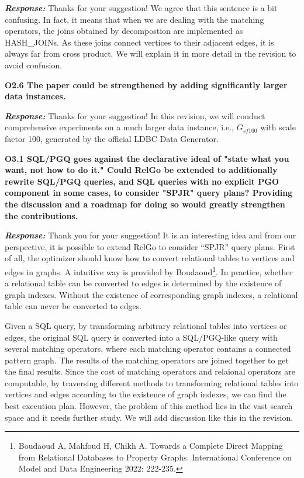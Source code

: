 \textbf{\textit{Response: }}
Thanks for your suggestion! We agree that this sentence is a bit confusing. In fact, it means that when we are dealing with the matching operators, the joins obtained by decompostion are implemented as HASH\_JOINs. As these joins connect vertices to their adjacent edges, it is always far from cross product. We will explain it in more detail in the revision to avoid confusion.


\textbf{
O2.6 The paper could be strengthened by adding significantly larger data instances.}

\textbf{\textit{Response: }}
Thanks for your suggestion! In this revision, we will conduct comprehensive experiments on a much larger data instance, i.e., $G_{sf100}$ with scale factor 100, generated by the official LDBC Data Generator.


\textbf{O3.1 SQL/PGQ goes against the declarative ideal of "state what you want, not how to do it." 
Could RelGo be extended to additionally rewrite SQL/PGQ queries, and SQL queries with no explicit PGO component in some cases, to consider "SPJR" query plans? 
Providing the discussion and a roadmap for doing so would greatly strengthen the contributions.}

\textbf{\textit{Response: }}
Thank you for your suggestion! 
It is an interesting idea and from our perspective, it is possible to extend RelGo to consider ``SPJR'' query plans.
First of all, the optimizer should know how to convert relational tables to vertices and edges in graphs.
A intuitive way is provided by Boudaoud\footnote{Boudaoud A, Mahfoud H, Chikh A. Towards a Complete Direct Mapping from Relational Databases to Property Graphs. International Conference on Model and Data Engineering 2022: 222-235.}.
In practice, whether a relational table can be converted to edges is determined by the existence of graph indexes.
Without the existence of corresponding graph indexes, a relational table can never be converted to edges.

Given a SQL query, by transforming arbitrary relational tables into vertices or edges, the original SQL query is converted into a SQL/PGQ-like query with several matching operators, where each matching operator contains a connected pattern graph.
The results of the matching operators are joined together to get the final results.
Since the cost of matching operators and relaional operators are computable, by traversing different methods to transforming relational tables into vertices and edges according to the existence of graph indexes, we can find the best execution plan.
However, the problem of this method lies in the vast search space and it needs further study. We will add discussion like this in the revision.

